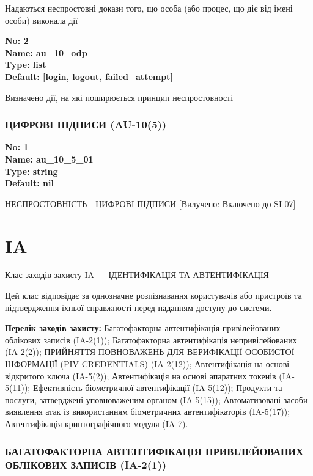 \documentclass{article}
\begin{document}
{\footnotesize Надаються неспростовні докази того, що особа (або процес, що діє від імені особи) виконала дії}


{\footnotesize\bfseries
No: 2\\
Name: au\_10\_odp\\
Type: list\\
Default: [\textquotedbl{}login\textquotedbl{}, \textquotedbl{}logout\textquotedbl{}, \textquotedbl{}failed\_attempt\textquotedbl{}]
}

{\footnotesize Визначено дії, на які поширюється принцип неспростовності}




\subsubsection{ЦИФРОВІ ПІДПИСИ (AU-10(5))}


\vspace{10pt}
{\footnotesize\bfseries
No: 1\\
Name: au\_10\_5\_01\\
Type: string\\
Default: nil
}

{\footnotesize НЕСПРОСТОВНІСТЬ - ЦИФРОВІ ПІДПИСИ [Вилучено: Включено до SI-07]}




\section{IA}
Клас заходів захисту IA --- ІДЕНТИФІКАЦІЯ ТА АВТЕНТИФІКАЦІЯ

Цей клас відповідає за однозначне розпізнавання користувачів або пристроїв та підтвердження їхньої справжності перед наданням доступу до системи.

\textbf{Перелік заходів захисту:} Багатофакторна автентифікація привілейованих облікових записів (IA-2(1)); Багатофакторна автентифікація непривілейованих (IA-2(2)); ПРИЙНЯТТЯ ПОВНОВАЖЕНЬ ДЛЯ ВЕРИФІКАЦІЇ ОСОБИСТОЇ ІНФОРМАЦІЇ (PIV CREDENTIALS) (IA-2(12)); Автентифікація на основі відкритого ключа (IA-5(2)); Автентифікація на основі апаратних токенів (IA-5(11)); Ефективність біометричної автентифікації (IA-5(12)); Продукти та послуги, затверджені уповноваженим органом (IA-5(15)); Автоматизовані засоби виявлення атак із використанням біометричних автентифікаторів (IA-5(17)); Автентифікація криптографічного модуля (IA-7).

\subsubsection{БАГАТОФАКТОРНА АВТЕНТИФІКАЦІЯ ПРИВІЛЕЙОВАНИХ ОБЛІКОВИХ ЗАПИСІВ (IA-2(1))}
\end{document}
